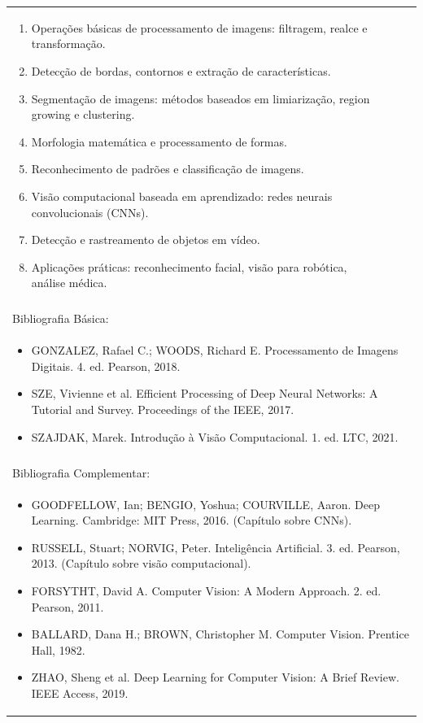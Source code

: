 \documentclass[11pt]{article}
\begin{document}
\begin{center}
\begin{longtable}{|p{4cm}|p{4cm}|p{4cm}|p{4cm}|}
{\begin{enumerate}
\item Operações básicas de processamento de imagens: filtragem, realce e transformação.
\item Detecção de bordas, contornos e extração de características.
\item Segmentação de imagens: métodos baseados em limiarização, region growing e clustering.
\item Morfologia matemática e processamento de formas.
\item Reconhecimento de padrões e classificação de imagens.
\item Visão computacional baseada em aprendizado: redes neurais convolucionais (CNNs).
\item Detecção e rastreamento de objetos em vídeo.
\item Aplicações práticas: reconhecimento facial, visão para robótica, análise médica.\end{enumerate}}\\
\multicolumn{4}{|p{16cm}|}{}\\
\hline
\multicolumn{4}{|p{16cm}|}{Bibliografia Básica:}\\
\multicolumn{4}{|p{\dimexpr 16cm + 6\tabcolsep\relax}|}{%
\begin{itemize}\item GONZALEZ, Rafael C.; WOODS, Richard E. Processamento de Imagens Digitais. 4. ed. Pearson, 2018.
\item SZE, Vivienne et al. Efficient Processing of Deep Neural Networks: A Tutorial and Survey. Proceedings of the IEEE, 2017.
\item SZAJDAK, Marek. Introdução à Visão Computacional. 1. ed. LTC, 2021.\end{itemize}}\\
\multicolumn{4}{|p{16cm}|}{}\\
\hline
\multicolumn{4}{|p{16cm}|}{Bibliografia Complementar:}\\
\multicolumn{4}{|p{\dimexpr 16cm + 6\tabcolsep\relax}|}{%
\begin{itemize}\item GOODFELLOW, Ian; BENGIO, Yoshua; COURVILLE, Aaron. Deep Learning. Cambridge: MIT Press, 2016. (Capítulo sobre CNNs).
\item RUSSELL, Stuart; NORVIG, Peter. Inteligência Artificial. 3. ed. Pearson, 2013. (Capítulo sobre visão computacional).
\item FORSYTHT, David A. Computer Vision: A Modern Approach. 2. ed. Pearson, 2011.
\item BALLARD, Dana H.; BROWN, Christopher M. Computer Vision. Prentice Hall, 1982.
\item ZHAO, Sheng et al. Deep Learning for Computer Vision: A Brief Review. IEEE Access, 2019.\end{itemize}}\\
\hline
\end{longtable}
\end{center}
\end{document}
